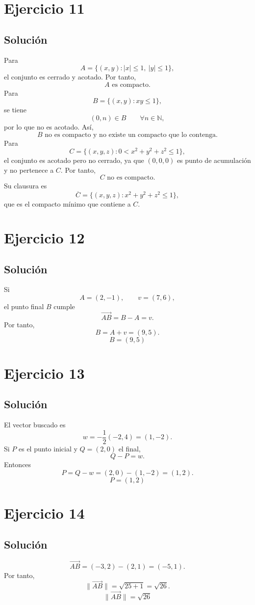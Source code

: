 \documentclass[11pt,a4paper]{article}
\begin{document}
\section{Ejercicio 11}
\subsection{Solución}
Para
\[
A=\{(x,y):|x|\leq1,\ |y|\leq1\},
\]
el conjunto es cerrado y acotado. Por tanto,
\[
\boxed{A\text{ es compacto}.}
\]
Para
\[
B=\{(x,y):xy\leq1\},
\]
se tiene
\[
(0,n)\in B\qquad\forall n\in\mathbb N,
\]
por lo que no es acotado. Así,
\[
\boxed{
B\text{ no es compacto y no existe un compacto que lo contenga}.
}
\]
Para
\[
C=\{(x,y,z):0<x^2+y^2+z^2\leq1\},
\]
el conjunto es acotado pero no cerrado, ya que \((0,0,0)\) es punto de acumulación y no pertenece a \(C\). Por tanto,
\[
\boxed{C\text{ no es compacto}.}
\]
Su clausura es
\[
\boxed{
\overline C=
\{(x,y,z):x^2+y^2+z^2\leq1\},
}
\]
que es el compacto mínimo que contiene a \(C\).

\section{Ejercicio 12}
\subsection{Solución}
Si
\[
A=(2,-1),
\qquad
v=(7,6),
\]
el punto final \(B\) cumple
\[
\overrightarrow{AB}=B-A=v.
\]
Por tanto,
\[
B=A+v=(9,5).
\]
\[
\boxed{B=(9,5)}
\]

\section{Ejercicio 13}
\subsection{Solución}
El vector buscado es
\[
w=-\frac12(-2,4)=(1,-2).
\]
Si \(P\) es el punto inicial y \(Q=(2,0)\) el final,
\[
Q-P=w.
\]
Entonces
\[
P=Q-w=(2,0)-(1,-2)=(1,2).
\]
\[
\boxed{P=(1,2)}
\]

\section{Ejercicio 14}
\subsection{Solución}
\[
\overrightarrow{AB}
=
(-3,2)-(2,1)
=
(-5,1).
\]
Por tanto,
\[
\|\overrightarrow{AB}\|
=
\sqrt{25+1}
=
\sqrt{26}.
\]
\[
\boxed{\|\overrightarrow{AB}\|=\sqrt{26}}
\]
\end{document}
